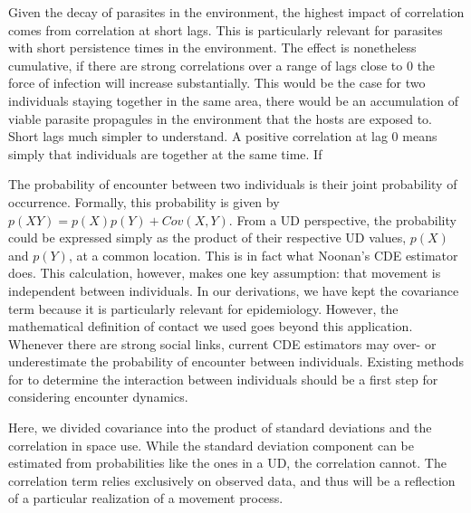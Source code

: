 \documentclass[letterpaper]{article}
\begin{document}
Given the decay of parasites in the environment, the highest impact of correlation comes from correlation at short lags. %
This is particularly relevant for parasites with short persistence times in the environment. %
The effect is nonetheless cumulative, if there are strong correlations over a range of lags close to 0 the force of infection will increase substantially. This would be the case for two individuals staying together in the same area, there would be an accumulation of viable parasite propagules in the environment that the hosts are exposed to. 
Short lags much simpler to understand. A positive correlation at lag 0 means simply that individuals are together at the same time. 
If 



The probability of encounter between two individuals is their joint probability of occurrence.  Formally, this probability is given by $p(XY)=p(X)p(Y)+Cov(X,Y)$. From a UD perspective, the probability could be expressed simply as the product of their respective UD values, $p(X)$ and $p(Y)$, at a common location. %
This is in fact what Noonan's CDE estimator does. This calculation, however, makes one key assumption: that movement is independent between individuals. 
In our derivations, we have kept the covariance term because it is particularly relevant for epidemiology. However, the mathematical definition of contact we used goes beyond this application.  Whenever there are strong social links, current CDE estimators may over- or underestimate the probability of encounter between individuals. 
Existing methods for to determine the interaction between individuals \citep{Scharf2018} should be a first step for considering encounter dynamics. 

Here, we divided covariance into the product of standard deviations and the correlation in space use. While the standard deviation component can be estimated from probabilities like the ones in a UD, the correlation cannot. The correlation term relies exclusively on observed data, and thus will be a reflection of a particular realization of a movement process. 
\end{document}
